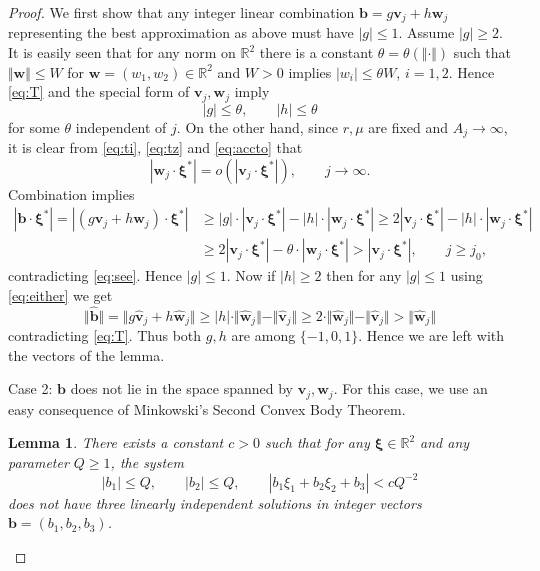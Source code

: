\documentclass[10pt]{amsart}
\newtheorem{lemma}[theorem]{Lemma}
\theoremstyle{definition}
\newcommand{\ux}{\boldsymbol{\xi}}
\newcommand{\w}{\boldsymbol{w}}
\newcommand{\vv}{\boldsymbol{v}}
\newcommand{\uxs}{\boldsymbol{\xi}^{\ast}}
\newcommand{\bb}{\boldsymbol{b}}
\newcommand{\R}{\mathbb{R}}
\begin{document}
\begin{proof}
	
We first show that any integer linear combination $\bb=g\vv_j+h\w_j$ representing the best approximation as above must have $|g|\le 1$. 
Assume $|g|\ge 2$. 
It is easily seen that for any norm on $\R^2$ there is a constant $\theta=\theta(\Vert\cdot\Vert)$
such that $\Vert \w\Vert \le W$ for $\w=(w_1,w_2)\in\R^2$ and $W>0$ 
implies $|w_i|\le \theta W$, $i=1,2$. 
Hence \eqref{eq:T} and the special form of $\vv_j, \w_j$
imply
\[
|g|\le \theta, \qquad |h|\le \theta
\]
for some $\theta$ independent of $j$. On the other hand, since $r,\mu$ are fixed and $A_j\to\infty$, it is clear
from \eqref{eq:ti}, \eqref{eq:tz} and \eqref{eq:accto} that
\[
|\w_j\cdot \uxs| = o(|\vv_j\cdot \uxs|), \qquad j\to\infty. 
\]
Combination implies
\begin{align*}
|\bb \cdot \uxs|= | (g\vv_j+h\w_j) \cdot \uxs| &\ge |g|\cdot |\vv_j\cdot \uxs| - |h|\cdot |\w_j\cdot \uxs| \ge 2 |\vv_j\cdot \uxs| - |h|\cdot |\w_j\cdot \uxs|\\ &\ge
2 |\vv_j\cdot \uxs| - \theta\cdot |\w_j\cdot \uxs| > |\vv_j\cdot \uxs|, \qquad j\ge j_0,
\end{align*}
contradicting \eqref{eq:see}. Hence $|g|\le 1$. Now if $|h|\ge 2$ then 
for any $|g|\le 1$ using \eqref{eq:either} we get 
\[
\Vert \hat{\bb}\Vert= \Vert g \hat{\vv}_j+h\hat{\w}_j\Vert \ge |h|\cdot \Vert \hat{\w}_j\Vert - \Vert \hat{\vv}_j\Vert \ge 2 \cdot \Vert \hat{\w}_j\Vert - \Vert \hat{\vv}_j\Vert > \Vert \hat{\w}_j\Vert
\]
contradicting \eqref{eq:T}. Thus both $g,h$ are among $\{-1,0,1\}$. 
Hence we are left with the vectors of the lemma. 

Case 2: $\bb$ does not lie in the space spanned by $\vv_j, \w_j$.
For this case, we use an easy consequence of Minkowski's Second Convex
Body Theorem.

\begin{lemma}  \label{lemur}
	There exists a constant $c>0$ such that for any $\ux\in \R^2$ and
	any parameter $Q\ge 1$, the system
	\[
	|b_1|\le Q,\qquad |b_2|\le Q,\qquad  |b_1 \xi_1 + b_2 \xi_2+b_{3}| < cQ^{-2}
	\]
	does not have three linearly independent solutions in integer
	vectors $\bb=(b_1,b_2,b_3)$.
\end{lemma}


\end{proof}
\end{document}
